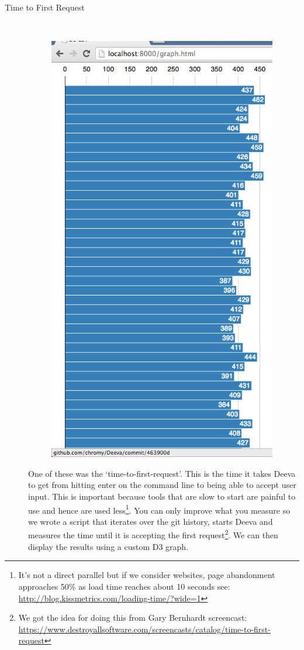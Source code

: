 \documentclass[11pt, a4paper]{article}
\begin{document}
\begin{description}
\item[Time to First Request] \hfill \\
\begin{figure}[h!]
\centering
\includegraphics[width=100mm]{timeToFirstRequest.png}
\end{figure}

One of these was the `time-to-first-request'.
This is the time it takes Deeva to get from hitting enter on the command line to being able to accept user input.
This is important because tools that are slow to start are painful to use and hence are used less\footnote{It's not a direct parallel but if we consider websites, page abandonment approaches 50\% as load time reaches about 10 seconds see: \url{http://blog.kissmetrics.com/loading-time/?wide=1}}.
You can only improve what you measure so we wrote a script that iterates over the git history, starts Deeva and measures the time until it is accepting the first request\footnote{We got the idea for doing this from Gary Bernhardt screencast: \url{https://www.destroyallsoftware.com/screencasts/catalog/time-to-first-request}}.
We can then display the results using a custom D3 graph.


\end{description}
\end{document}

